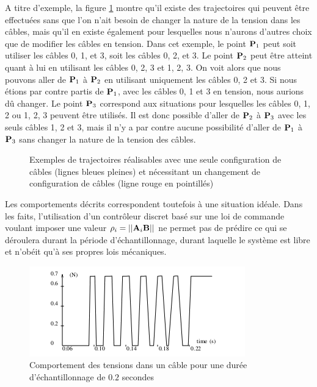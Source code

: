 A titre d'exemple, la figure \ref{chap01:fig000} montre qu'il existe des 
trajectoires qui peuvent être effectuées sans que l'on n'ait besoin de changer 
la nature de la tension dans les câbles, mais qu'il en existe également pour 
lesquelles nous n'aurons d'autres choix que de modifier les câbles en tension. 
Dans cet exemple, le point ${\bf P}_1$ peut soit utiliser les câbles 0, 1, et 3, 
soit les câbles 0, 2, et 3. Le point ${\bf P}_2$ peut être atteint quant à lui 
en utilisant les câbles 0, 2, 3 et 1, 2, 3. On voit alors que nous pouvons 
aller de ${\bf P}_1$ à ${\bf P}_2$ en utilisant uniquement les câbles 0, 2 et 3. 
Si nous étions par contre partis de ${\bf P}_1$, avec les câbles 0, 1 et 3 en 
tension, nous aurions d\^u changer. Le point ${\bf P}_3$ correspond aux 
situations pour lesquelles les câbles 0, 1, 2 ou 1, 2, 3 peuvent être utilisés. 
Il est donc possible d'aller de ${\bf P}_2$ à ${\bf P}_3$ avec les seuls câbles 
1, 2 et 3, mais il n'y a par contre aucune possibilité d'aller de ${\bf P}_1$ à 
${\bf P}_3$ sans changer la nature de la tension des câbles.


\begin{figure}[!ht]
  \centering
    \def\svgwidth{.65\linewidth}
  
    \caption{\footnotesize{Exemples de trajectoires réalisables avec une seule 
configuration de câbles (lignes bleues pleines) et nécessitant un changement de 
configuration de câbles (ligne rouge en pointillés)}}
\label{chap01:fig000}
\end{figure}

Les comportements décrits correspondent toutefois à une situation idéale. Dans 
les faits, l'utilisation d'un contrôleur discret basé sur une loi de commande 
voulant imposer une valeur $\rho_i = ||{\bf A}_i{\bf B}||$ ne permet pas de 
prédire ce qui se déroulera durant la période d'échantillonnage, durant laquelle 
le système est libre et n'obéit qu'à ses propres lois mécaniques.

\begin{figure}[!htp]
  \centering
    \includegraphics[width=.75\linewidth]{./chapter01/figures/controleur_discret.png}
    \caption{\footnotesize Comportement des tensions dans un câble pour une 
durée d'échantillonnage de $0.2$ secondes}
\label{chap01:fig00}
\end{figure}

